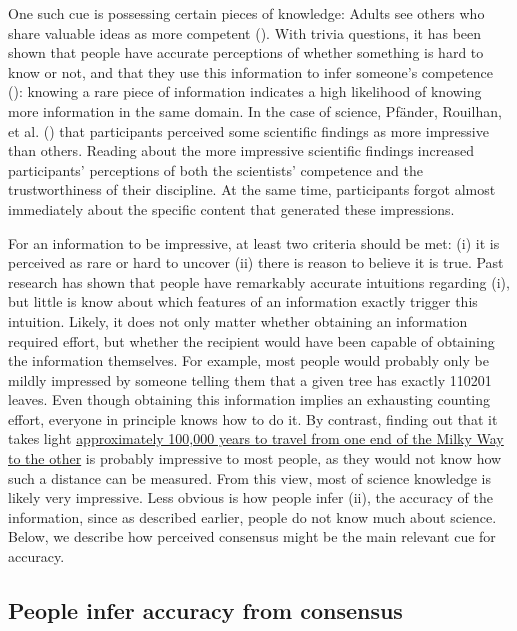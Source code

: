 \documentclass[
  jou,
  floatsintext,
  longtable,
  nolmodern,
  notxfonts,
  notimes,
  colorlinks=true,linkcolor=blue,citecolor=blue,urlcolor=blue]{apa7}
\begin{document}
One such cue is possessing certain pieces of knowledge: Adults see
others who share valuable ideas as more competent
(). With trivia
questions, it has been shown that people have accurate perceptions of
whether something is hard to know or not, and that they use this
information to infer someone's competence
():
knowing a rare piece of information indicates a high likelihood of
knowing more information in the same domain. In the case of science,
Pfänder, Rouilhan, et al.
() that
participants perceived some scientific findings as more impressive than
others. Reading about the more impressive scientific findings increased
participants' perceptions of both the scientists' competence and the
trustworthiness of their discipline. At the same time, participants
forgot almost immediately about the specific content that generated
these impressions.

For an information to be impressive, at least two criteria should be
met: (i) it is perceived as rare or hard to uncover (ii) there is reason
to believe it is true. Past research has shown that people have
remarkably accurate intuitions regarding (i), but little is know about
which features of an information exactly trigger this intuition. Likely,
it does not only matter whether obtaining an information required
effort, but whether the recipient would have been capable of obtaining
the information themselves. For example, most people would probably only
be mildly impressed by someone telling them that a given tree has
exactly 110201 leaves. Even though obtaining this information implies an
exhausting counting effort, everyone in principle knows how to do it. By
contrast, finding out that it takes light
\href{https://imagine.gsfc.nasa.gov/features/cosmic/milkyway_info.html}{approximately
100,000 years to travel from one end of the Milky Way to the other} is
probably impressive to most people, as they would not know how such a
distance can be measured. From this view, most of science knowledge is
likely very impressive. Less obvious is how people infer (ii), the
accuracy of the information, since as described earlier, people do not
know much about science. Below, we describe how perceived consensus
might be the main relevant cue for accuracy.

\subsection{People infer accuracy from
consensus}\label{people-infer-accuracy-from-consensus}
\end{document}
